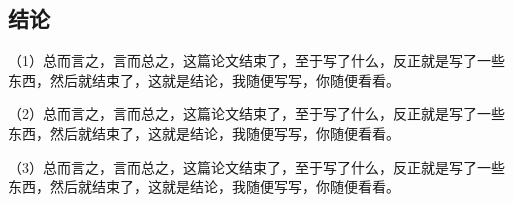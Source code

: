\begin{ujnconclusion}
\section[结论]{结\qquad 论}
（1）总而言之，言而总之，这篇论文结束了，至于写了什么，反正就是写了一些东西，然后就结束了，这就是结论，我随便写写，你随便看看。

（2）总而言之，言而总之，这篇论文结束了，至于写了什么，反正就是写了一些东西，然后就结束了，这就是结论，我随便写写，你随便看看。

（3）总而言之，言而总之，这篇论文结束了，至于写了什么，反正就是写了一些东西，然后就结束了，这就是结论，我随便写写，你随便看看。
\end{ujnconclusion}
